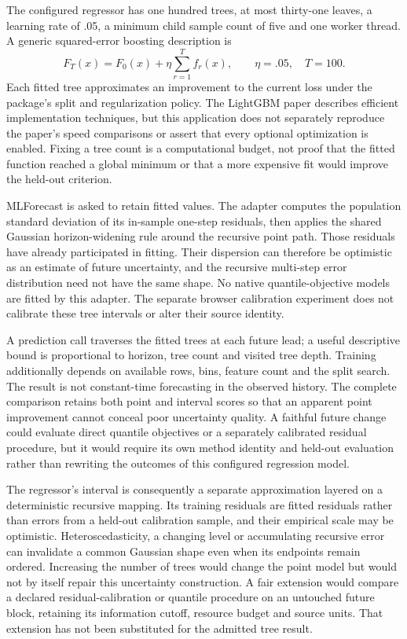 The configured regressor has one hundred trees, at most thirty-one leaves, a learning rate of .05, a minimum child sample count of five and one worker thread. A generic squared-error boosting description is
\begin{equation}\label{eq:report-boosting}
F_T(x)=F_0(x)+\eta\sum_{r=1}^{T}f_r(x),\qquad \eta=.05,\quad T=100.
\end{equation}
Each fitted tree approximates an improvement to the current loss under the package's split and regularization policy. The LightGBM paper describes efficient implementation techniques, but this application does not separately reproduce the paper's speed comparisons or assert that every optional optimization is enabled. Fixing a tree count is a computational budget, not proof that the fitted function reached a global minimum or that a more expensive fit would improve the held-out criterion.

MLForecast is asked to retain fitted values. The adapter computes the population standard deviation of its in-sample one-step residuals, then applies the shared Gaussian horizon-widening rule around the recursive point path. Those residuals have already participated in fitting. Their dispersion can therefore be optimistic as an estimate of future uncertainty, and the recursive multi-step error distribution need not have the same shape. No native quantile-objective models are fitted by this adapter. The separate browser calibration experiment does not calibrate these tree intervals or alter their source identity.

A prediction call traverses the fitted trees at each future lead; a useful descriptive bound is proportional to horizon, tree count and visited tree depth. Training additionally depends on available rows, bins, feature count and the split search. The result is not constant-time forecasting in the observed history. The complete comparison retains both point and interval scores so that an apparent point improvement cannot conceal poor uncertainty quality. A faithful future change could evaluate direct quantile objectives or a separately calibrated residual procedure, but it would require its own method identity and held-out evaluation rather than rewriting the outcomes of this configured regression model.

The regressor's interval is consequently a separate approximation layered on a deterministic recursive mapping. Its training residuals are fitted residuals rather than errors from a held-out calibration sample, and their empirical scale may be optimistic. Heteroscedasticity, a changing level or accumulating recursive error can invalidate a common Gaussian shape even when its endpoints remain ordered. Increasing the number of trees would change the point model but would not by itself repair this uncertainty construction. A fair extension would compare a declared residual-calibration or quantile procedure on an untouched future block, retaining its information cutoff, resource budget and source units. That extension has not been substituted for the admitted tree result.

